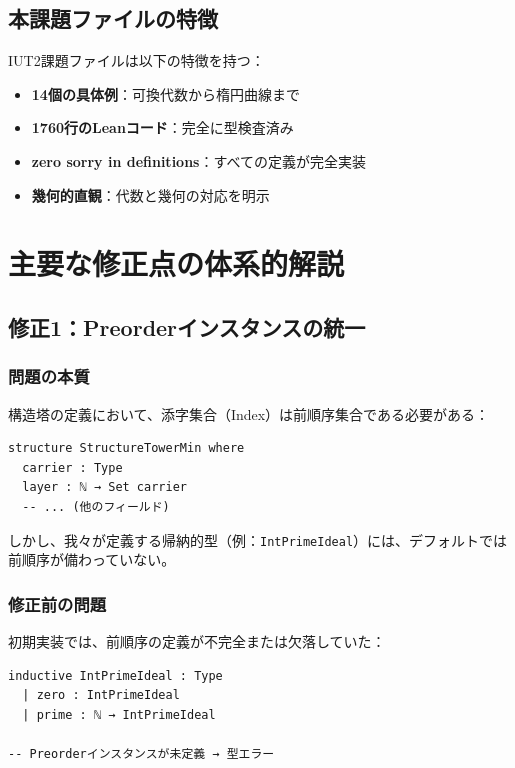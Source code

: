 \documentclass{ltjsarticle}
\begin{document}
\subsection{本課題ファイルの特徴}

IUT2課題ファイルは以下の特徴を持つ：

\begin{itemize}
\item \textbf{14個の具体例}：可換代数から楕円曲線まで
\item \textbf{1760行のLeanコード}：完全に型検査済み
\item \textbf{zero sorry in definitions}：すべての定義が完全実装
\item \textbf{幾何的直観}：代数と幾何の対応を明示
\end{itemize}

\section{主要な修正点の体系的解説}

\subsection{修正1：Preorderインスタンスの統一}

\subsubsection{問題の本質}

構造塔の定義において、添字集合（Index）は前順序集合である必要がある：

\begin{lstlisting}[caption=構造塔の型シグネチャ]
structure StructureTowerMin where
  carrier : Type
  layer : ℕ → Set carrier
  -- ... (他のフィールド)
\end{lstlisting}

しかし、我々が定義する帰納的型（例：\texttt{IntPrimeIdeal}）には、デフォルトでは前順序が備わっていない。

\subsubsection{修正前の問題}

初期実装では、前順序の定義が不完全または欠落していた：

\begin{lstlisting}[caption=問題のあるコード例]
inductive IntPrimeIdeal : Type
  | zero : IntPrimeIdeal
  | prime : ℕ → IntPrimeIdeal

-- Preorderインスタンスが未定義 → 型エラー
\end{lstlisting}
\end{document}
